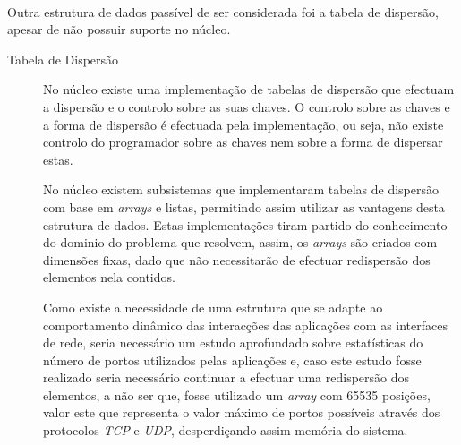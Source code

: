 \begin{description}





\end{description}

\paragraph*{}
Outra estrutura de dados passível de ser considerada foi a tabela de dispersão, apesar de não possuir suporte no núcleo.

\begin{description}
\item[Tabela de Dispersão]
No núcleo existe uma implementação de tabelas de dispersão que efectuam a dispersão e o controlo sobre as suas chaves.
O controlo sobre as chaves e a forma de dispersão é efectuada pela implementação, ou seja, não existe controlo do programador sobre as chaves nem sobre a forma de dispersar estas.

No núcleo existem subsistemas que implementaram tabelas de dispersão com base em \textit{arrays} e listas, permitindo assim utilizar as vantagens desta estrutura de dados.
Estas implementações tiram partido do conhecimento do dominio do problema que resolvem, assim, os \textit{arrays} são criados com dimensões fixas, dado que não necessitarão de efectuar redispersão dos elementos nela contidos.

Como existe a necessidade de uma estrutura que se adapte ao comportamento dinâmico das interacções das aplicações com as interfaces de rede, seria necessário um estudo aprofundado sobre estatísticas do número de portos utilizados pelas aplicações e, caso este estudo fosse realizado seria necessário continuar a efectuar uma redispersão dos elementos, a não ser que, fosse utilizado um \textit{array} com 65535 posições, valor este que representa o valor máximo de portos possíveis através dos protocolos \textit{TCP} e \textit{UDP}, desperdiçando assim memória do sistema.


\end{description}
